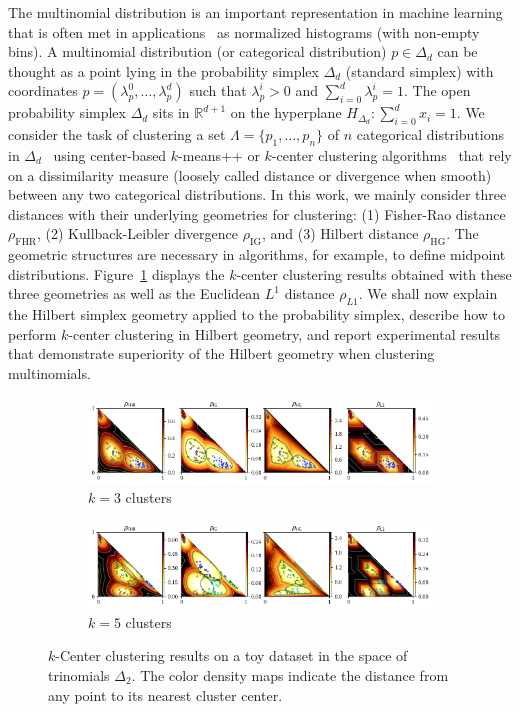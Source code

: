 \documentclass[graybox]{svmult}
\def\bbR{\mathbb{R}}
\def\FHR{\mathrm{FHR}}
\def\IG{\mathrm{IG}}
\def\HG{\mathrm{HG}}
\begin{document}
The multinomial distribution is an important representation in machine learning that is often met in applications~\cite{MetricLearning-2002, ClusteringSimplex-2008} as normalized histograms (with non-empty bins). 
A multinomial distribution (or categorical distribution) $p\in\Delta_d$ can be thought as a point lying in the probability simplex $\Delta_d$ (standard simplex) with coordinates $p=(\lambda_p^0,\ldots,\lambda_p^d)$  such that $\lambda_p^i>0$ and $\sum_{i=0}^d \lambda_p^i=1$. The open probability simplex $\Delta_d$ sits in $\bbR^{d+1}$ on the hyperplane $H_{\Delta_d}: \sum_{i=0}^d x_i =1$.
We consider the task of clustering a set $\Lambda=\{p_1,\ldots,p_n\}$ of $n$ categorical distributions
in $\Delta_d$~\cite{ClusteringSimplex-2008}
using center-based $k$-means++ or $k$-center clustering algorithms~\cite{kmeanspp-2007,kcenter-1985}
that rely on a dissimilarity measure (loosely called distance or divergence when smooth) between any two categorical distributions. 
In this work, we mainly consider three distances with their underlying geometries for clustering:
(1) Fisher-Rao distance $\rho_\FHR$, (2) Kullback-Leibler divergence $\rho_\IG$, and (3) Hilbert distance $\rho_\HG$.
The geometric structures are necessary in algorithms, for example, to define midpoint distributions.
Figure~\ref{fig:results} displays the $k$-center clustering results obtained with these three geometries
as well as the Euclidean $L^1$ distance $\rho_{L1}$.
We shall now explain the Hilbert simplex geometry applied to the probability simplex, describe how to perform $k$-center clustering in Hilbert geometry, and report  experimental results that demonstrate superiority of the Hilbert geometry when clustering multinomials.

\begin{figure}[!t]
\centering
\begin{subfigure}{\textwidth}
\includegraphics[width=\textwidth]{kcenters3}
\caption{$k=3$ clusters}
\end{subfigure}
\begin{subfigure}{\textwidth}
\includegraphics[width=\textwidth]{kcenters5}
\caption{$k=5$ clusters}
\end{subfigure}
\caption{$k$-Center clustering results on a toy dataset in the space of trinomials $\Delta_2$.
The color density maps indicate the distance from any point to its nearest cluster center.}\label{fig:results}
\end{figure}
\end{document}
